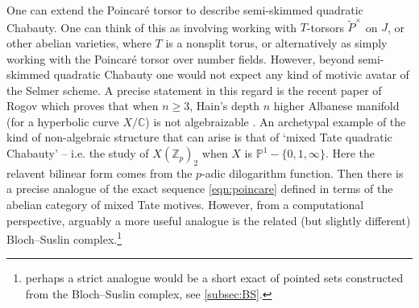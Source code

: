 \documentclass[11pt]{amsart}
\def\Z{\mathbb Z}
\theoremstyle{plain}
\theoremstyle{definition}
\begin{document}
One can extend the Poincar\'e torsor to describe semi-skimmed quadratic Chabauty. One can think of this as involving working with $T$-torsors $\widetilde{P}^\times $ on $J$, or other abelian varieties, where $T$ is a nonsplit torus, or alternatively as simply working with the Poincar\'e torsor over number fields. However, beyond semi-skimmed quadratic Chabauty one would not expect any kind of motivic avatar of the Selmer scheme. A precise statement in this regard is the recent paper of Rogov which proves that when $n\geq 3$, Hain's depth $n$ higher Albanese manifold (for a hyperbolic curve $X/\mathbb{C}$) is not algebraizable \cite{rogov2025minimal}. An archetypal example of the kind of non-algebraic structure that can arise is that of `mixed Tate quadratic Chabauty' -- i.e. the study of $X(\Z _p )_2$ when $X$ is $\mathbb{P}^1 -\{ 0,1,\infty \}$. Here the relavent bilinear form comes from the $p$-adic dilogarithm function. Then there is a precise analogue of the exact sequence \eqref{eqn:poincare} defined in terms of the abelian category of mixed Tate motives. However, from a computational perspective, arguably a more useful analogue is the related (but slightly different) Bloch--Suslin complex.\footnote{perhaps a strict analogue would be a short exact of pointed sets constructed from the Bloch--Suslin complex, see \ref{subsec:BS}.}
\end{document}
